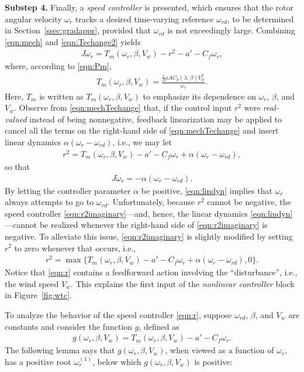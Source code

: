 \documentclass[journal]{IEEEtran}
\begin{document}
{\bf Substep 4.} Finally, a {\em speed controller} is presented, which ensures that the rotor angular velocity $\omega_r$ tracks a desired time-varying reference $\omega_{rd}$, to be determined in Section~\ref{ssec:gradappr}, provided that $\omega_{rd}$ is not exceedingly large. Combining \eqref{eqn:mech} and \eqref{eqn:Techange2} yields
\begin{align}
J\dot{\omega}_r=T_m(\omega_r, \beta, V_w)-r^2-a'-C_f\omega_r, \label{eqn:mechTechange}
\end{align}
where, according to \eqref{eqn:Pm},
\begin{align}
T_m(\omega_r, \beta, V_w)=\frac{\frac{1}{2}\rho AC_p(\lambda, \beta)V_w^3}{\omega_r}. \label{eqn:Tm}
\end{align}
Here, $T_m$ is written as $T_m(\omega_r, \beta, V_w)$ to emphasize its dependence on $\omega_r$, $\beta$, and $V_w$. Observe from \eqref{eqn:mechTechange} that, if the control input $r^2$ were {\em real-valued} instead of being nonnegative, feedback linearization may be applied to cancel all the terms on the right-hand side of \eqref{eqn:mechTechange} and insert linear dynamics $\alpha (\omega_r-\omega_{rd})$, i.e., we may let
\begin{align}
r^2=T_m(\omega_r, \beta, V_w)-a'-C_f\omega_r+\alpha(\omega_r-\omega_{rd}),\label{eqn:r2imaginary}
\end{align}
so that
\begin{align}
J\dot{\omega}_r=-\alpha(\omega_r-\omega_{rd}).\label{eqn:lindyn}
\end{align}
By letting the controller parameter $\alpha$ be positive, \eqref{eqn:lindyn} implies that $\omega_r$ always attempts to go to $\omega_{rd}$. Unfortunately, because $r^2$ cannot be negative, the speed controller \eqref{eqn:r2imaginary}---and, hence, the linear dynamics \eqref{eqn:lindyn}---cannot be realized whenever the right-hand side of \eqref{eqn:r2imaginary} is negative. To alleviate this issue, \eqref{eqn:r2imaginary} is slightly modified by setting $r^2$ to zero whenever that occurs, i.e.,
\begin{align}
r^2\!=\!\max\{T_m(\omega_r, \beta, V_w)\!-\!a'\!-\!C_f\omega_r\!+\!\alpha (\omega_r\!-\!\omega_{rd}), 0\}.\label{eqn:r}
\end{align}
Notice that \eqref{eqn:r} contains a feedforward action involving the ``disturbance'', i.e., the wind speed $V_w$. This explains the first input of the {\it nonlinear controller} block in Figure~\ref{fig:wtc}.

To analyze the behavior of the speed controller \eqref{eqn:r}, suppose $\omega_{rd}$, $\beta$, and $V_w$ are constants and consider the function $g$, defined as
\begin{align}
g(\omega_r, \beta, V_w)=T_m(\omega_r, \beta, V_w)-a'-C_f\omega_r.\label{eqn:g}
\end{align}
The following lemma says that $g(\omega_r, \beta, V_w)$, when viewed as a function of $\omega_r$, has a positive root $\omega_r^{(1)}$, below which $g(\omega_r, \beta, V_w)$ is positive:
\end{document}
